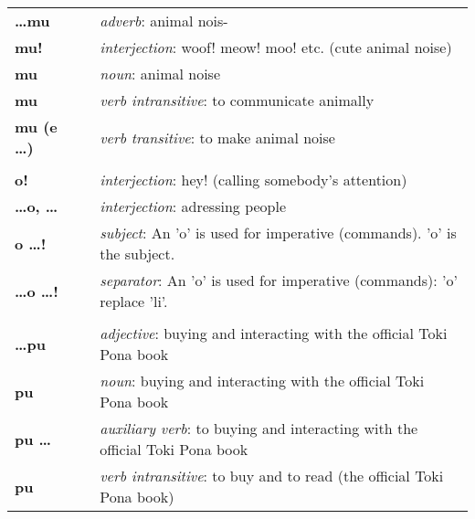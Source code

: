 \begin{supertabular}{p{2,5cm}|ll}
    \textbf{\dots mu}        &  & \textit{adverb}: animal nois-                                                       \\ %
    \textbf{mu!}             &  & \textit{interjection}: woof! meow! moo! etc. (cute animal noise)                    \\ %
    \textbf{mu}              &  & \textit{noun}: animal noise                                                         \\ %
    \textbf{mu}              &  & \textit{verb intransitive}: to communicate animally                                 \\ %
    \textbf{mu (e \dots)}    &  & \textit{verb transitive}: to make animal noise                                      \\ %
                             &  &                                                                                     \\ %
    \textbf{o!}              &  & \textit{interjection}: hey! (calling somebody's attention)                          \\ %
    \textbf{\dots o, \dots}  &  & \textit{interjection}: adressing people                                             \\ %
    \textbf{o \dots !}       &  & \textit{subject}: An 'o' is used for imperative (commands). 'o' is the subject.     \\ %
    \textbf{\dots o \dots !} &  & \textit{separator}: An 'o' is used for imperative (commands): 'o' replace 'li'.     \\ %
                             &  &                                                                                     \\ %
    \textbf{\dots pu}        &  & \textit{adjective}: buying and interacting with the official Toki Pona book         \\
    \textbf{pu}              &  & \textit{noun}: buying and interacting with the official Toki Pona book              \\
    \textbf{pu \dots}        &  & \textit{auxiliary verb}: to buying and interacting with the official Toki Pona book \\
    \textbf{pu}              &  & \textit{verb intransitive}:  to buy and to read (the official Toki Pona book)       \\

\end{supertabular}
